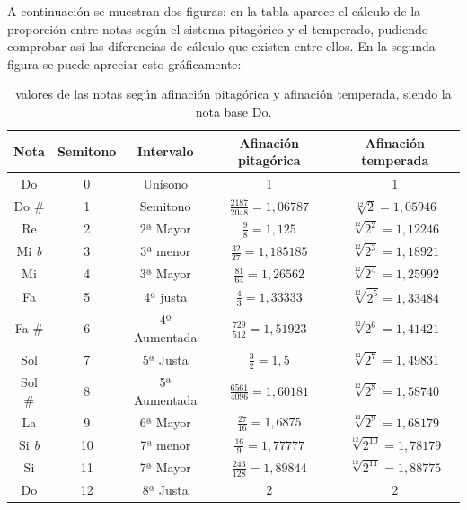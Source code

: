 \documentclass[a4paper, openright, 11pt, titlepage]{report}
\theoremstyle{definition}\newtheorem{defin}[propo]{Definition}
\theoremstyle{definition}\newtheorem{obser}[propo]{Remark}
\theoremstyle{definition}\newtheorem{ejem}[propo]{Ejemplo}
\theoremstyle{definition}\newtheorem{algoritmo}[propo]{Algoritmo}
\begin{document}
A continuación se muestran dos figuras: en la tabla aparece el cálculo de la proporción entre notas según el sistema pitagórico y el temperado, pudiendo comprobar así las diferencias de cálculo que existen entre ellos. En la segunda figura se puede apreciar esto gráficamente:
\begin{table}[H]
    \centering
    \begin{tabular}{|c|c|c|c|c|}
    \hline
         Nota & Semitono & Intervalo & Afinación pitagórica & Afinación temperada\\
         \hline
         \hline
         Do & 0 & Unísono & 1 & 1\\
         Do \# & 1 & Semitono & $\frac{2187}{2048} = 1,06787$ & $\sqrt[12]{2} = 1,05946$\\
         Re & 2 & 2ª Mayor & $\frac{9}{8} = 1,125$ & $\sqrt[12]{2^{2}} = 1,12246$\\
         Mi \textit{b} & 3 & 3ª menor & $\frac{32}{27} = 1,185185$ & $\sqrt[12]{2^{3}} = 1,18921$\\
         Mi & 4 & 3ª Mayor & $\frac{81}{64} = 1,26562$ & $\sqrt[12]{2^{4}} = 1,25992$\\
         Fa & 5 & 4ª justa & $\frac{4}{3} = 1,33333$ & $\sqrt[12]{2^{5}} = 1,33484$\\
         Fa \# & 6 & 4º Aumentada & $\frac{729}{512} = 1,51923$ & $\sqrt[12]{2^{6}} = 1,41421$\\
         Sol & 7 & 5ª Justa & $\frac{3}{2} = 1,5$ & $\sqrt[12]{2^{7}} = 1,49831$\\
         Sol \# & 8 & 5ª Aumentada & $\frac{6561}{4096} = 1,60181$ & $\sqrt[12]{2^{8}} = 1,58740$\\
         La & 9 & 6ª Mayor & $\frac{27}{16} = 1,6875$ & $\sqrt[12]{2^{9}} = 1,68179$\\
         Si \textit{b} & 10 & 7ª menor & $\frac{16}{9} = 1,77777$ & $\sqrt[12]{2^{10}} = 1,78179$\\
         Si & 11 & 7ª Mayor & $\frac{243}{128} = 1,89844$ & $\sqrt[12]{2^{11}} = 1,88775$\\
         Do & 12 & 8ª Justa & 2 & 2\\
         \hline
    \end{tabular}
    \caption{valores de las notas según afinación pitagórica y afinación temperada, siendo la nota base Do.}
    \label{tab:my_label}
\end{table}
\end{document}
